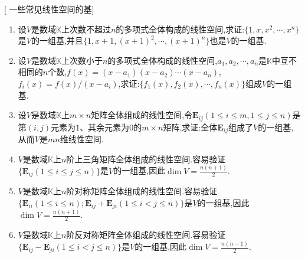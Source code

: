 \documentclass[../../main.tex]{subfiles}%
\begin{document}
\begin{example}\label{example:一些常见线性空间的基}[$\,\,$一些常见线性空间的基]
\begin{enumerate}[(1)]
\item \label{example:一些常见线性空间的基(1)}设\(V\)是数域\(\mathbb{K}\)上次数不超过\(n\)的多项式全体构成的线性空间,求证:\(\{1,x,x^2,\cdots,x^n\}\)是\(V\)的一组基,并且\(\{1,x + 1,(x + 1)^2,\cdots,(x + 1)^n\}\)也是\(V\)的一组基.
\item  \label{example:一些常见线性空间的基(2)}设\(V\)是数域\(\mathbb{K}\)上次数小于\(n\)的多项式全体构成的线性空间,\(a_1,a_2,\cdots,a_n\)是\(\mathbb{K}\)中互不相同的\(n\)个数,\(f(x)=(x - a_1)(x - a_2)\cdots(x - a_n)\),\(f_i(x)=f(x)/(x - a_i)\),求证:\(\{f_1(x),f_2(x),\cdots,f_n(x)\}\)组成\(V\)的一组基.
\item \label{example:一些常见线性空间的基(3)}设\(V\)是数域\(\mathbb{K}\)上\(m\times n\)矩阵全体组成的线性空间,令\(\boldsymbol{E}_{ij}(1\leqslant  i\leqslant  m,1\leqslant  j\leqslant  n)\)是第\((i,j)\)元素为\(1\)、其余元素为\(0\)的\(m\times n\)矩阵,求证:全体\(\boldsymbol{E}_{ij}\)组成了\(V\)的一组基,从而\(V\)是\(mn\)维线性空间.
\item  \label{example:一些常见线性空间的基(4)}\(V\)是数域\(\mathbb{K}\)上\(n\)阶上三角矩阵全体组成的线性空间.容易验证\(\{\boldsymbol{E}_{ij}(1\leqslant  i\leqslant  j\leqslant  n)\}\)是\(V\)的一组基,因此\(\dim V=\frac{n(n + 1)}{2}\).
\item  \label{example:一些常见线性空间的基(5)}\(V\)是数域\(\mathbb{K}\)上\(n\)阶对称矩阵全体组成的线性空间.容易验证\(\{\boldsymbol{E}_{ii}(1\leqslant  i\leqslant  n);\boldsymbol{E}_{ij}+\boldsymbol{E}_{ji}(1\leqslant  i< j\leqslant  n)\}\)是\(V\)的一组基,因此\(\dim V=\frac{n(n + 1)}{2}\).
\item  \label{example:一些常见线性空间的基(6)}\(V\)是数域\(\mathbb{K}\)上\(n\)阶反对称矩阵全体组成的线性空间.容易验证\(\{\boldsymbol{E}_{ij}-\boldsymbol{E}_{ji}(1\leqslant  i< j\leqslant  n)\}\)是\(V\)的一组基,因此\(\dim V=\frac{n(n - 1)}{2}\).
\end{enumerate}
\end{example}
\end{document}
